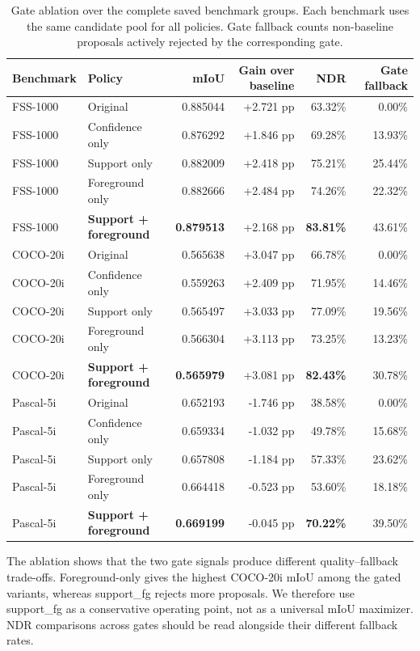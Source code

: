 \documentclass{CVM}
\begin{document}
\begin{table}[h!t]
\center
\caption{Gate ablation over the complete saved benchmark groups. Each benchmark uses the same candidate pool for all policies. Gate fallback counts non-baseline proposals actively rejected by the corresponding gate.}
\begin{tabular}{llrrrr}
\toprule
Benchmark & Policy & mIoU & Gain over baseline & NDR & Gate fallback \\
\midrule
FSS-1000 & Original & 0.885044 & +2.721 pp & 63.32\% & 0.00\% \\
FSS-1000 & Confidence only & 0.876292 & +1.846 pp & 69.28\% & 13.93\% \\
FSS-1000 & Support only & 0.882009 & +2.418 pp & 75.21\% & 25.44\% \\
FSS-1000 & Foreground only & 0.882666 & +2.484 pp & 74.26\% & 22.32\% \\
FSS-1000 & \textbf{Support + foreground} & \textbf{0.879513} & +2.168 pp & \textbf{83.81\%} & 43.61\% \\
\midrule
COCO-20i & Original & 0.565638 & +3.047 pp & 66.78\% & 0.00\% \\
COCO-20i & Confidence only & 0.559263 & +2.409 pp & 71.95\% & 14.46\% \\
COCO-20i & Support only & 0.565497 & +3.033 pp & 77.09\% & 19.56\% \\
COCO-20i & Foreground only & 0.566304 & +3.113 pp & 73.25\% & 13.23\% \\
COCO-20i & \textbf{Support + foreground} & \textbf{0.565979} & +3.081 pp & \textbf{82.43\%} & 30.78\% \\
\midrule
Pascal-5i & Original & 0.652193 & -1.746 pp & 38.58\% & 0.00\% \\
Pascal-5i & Confidence only & 0.659334 & -1.032 pp & 49.78\% & 15.68\% \\
Pascal-5i & Support only & 0.657808 & -1.184 pp & 57.33\% & 23.62\% \\
Pascal-5i & Foreground only & 0.664418 & -0.523 pp & 53.60\% & 18.18\% \\
Pascal-5i & \textbf{Support + foreground} & \textbf{0.669199} & -0.045 pp & \textbf{70.22\%} & 39.50\% \\
\bottomrule
\end{tabular}
\label{tab:ablation}
\end{table}

The ablation shows that the two gate signals produce different quality--fallback trade-offs. Foreground-only gives the highest COCO-20i mIoU among the gated variants, whereas support\_fg rejects more proposals. We therefore use support\_fg as a conservative operating point, not as a universal mIoU maximizer. NDR comparisons across gates should be read alongside their different fallback rates.
\end{document}

